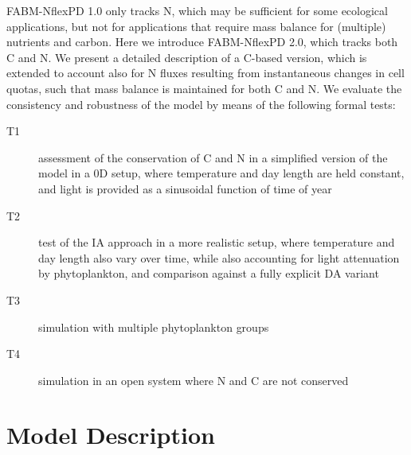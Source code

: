 \documentclass[gmd, manuscript]{copernicus}
\newcommand{\onur}[1]{\textcolor{blue}{\{Onur: #1\}}}
\newcommand{\markus}[1]{\textcolor{blue}{\{Markus: #1\}}}
\begin{document}
FABM-NflexPD 1.0 only tracks N, which may be sufficient for some ecological applications, but not for applications that require mass balance for (multiple) nutrients and carbon.  Here we introduce FABM-NflexPD 2.0, which tracks both C and N\@.  We present a detailed description of a C-based version, which is extended to account also for N fluxes resulting from instantaneous changes in cell quotas, such that mass balance is maintained for both C and N\@.  We evaluate the consistency and robustness of the model by means of the following formal tests:
\begin{description}
 \item [T1] assessment of the conservation of C and N in a simplified version of the model in a 0D setup, where temperature and day length are held constant, and light is provided as a sinusoidal function of time of year
 \item [T2] test of the IA approach in a more realistic setup, where temperature and day length also vary over time, while also accounting for light attenuation by phytoplankton, and comparison against a fully explicit DA variant 
 \item [T3] simulation with multiple phytoplankton groups
 \item [T4] simulation in an open system where N and C are not conserved
\end{description}



\section{Model Description}

\end{document}
